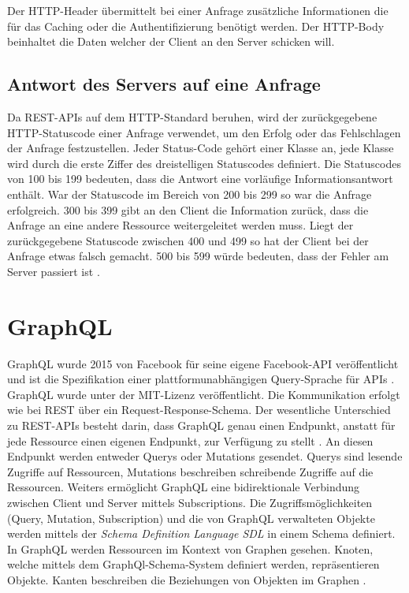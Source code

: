 Der HTTP-Header übermittelt bei einer Anfrage zusätzliche Informationen die für das Caching oder die Authentifizierung benötigt werden.
\newline
Der HTTP-Body beinhaltet die Daten welcher der Client an den Server schicken will.

\subsection{Antwort des Servers auf eine Anfrage}
Da REST-APIs auf dem HTTP-Standard beruhen, wird der zurückgegebene HTTP-Statuscode einer Anfrage verwendet, um den Erfolg oder das Fehlschlagen der Anfrage festzustellen.
Jeder Status-Code gehört einer Klasse an, jede Klasse wird durch die erste Ziffer des dreistelligen Statuscodes definiert.
Die Statuscodes von 100 bis 199 bedeuten, dass die Antwort eine vorläufige Informationsantwort enthält.
War der Statuscode im Bereich von 200 bis 299 so war die Anfrage erfolgreich.
300 bis 399 gibt an den Client die Information zurück, dass die Anfrage an eine andere Ressource weitergeleitet werden muss.
Liegt der zurückgegebene Statuscode zwischen 400 und 499 so hat der Client bei der Anfrage etwas falsch gemacht.
500 bis 599 würde bedeuten, dass der Fehler am Server passiert ist \cite[S. 120]{fielding2000architectural}.

\section{GraphQL}
GraphQL wurde 2015 von Facebook für seine eigene Facebook-API veröffentlicht und ist die Spezifikation einer plattformunabhängigen Query-Sprache für APIs \cite[S. 18]{kress2020graphql}.
GraphQL wurde unter der MIT-Lizenz veröffentlicht.
Die Kommunikation erfolgt wie bei REST über ein Request-Response-Schema.
Der wesentliche Unterschied zu REST-APIs besteht darin, dass GraphQL genau einen Endpunkt, anstatt für jede Ressource einen eigenen Endpunkt, zur Verfügung zu stellt \cite[S. 18]{kress2020graphql}.
An diesen Endpunkt werden entweder Querys oder Mutations gesendet.
Querys sind lesende Zugriffe auf Ressourcen, Mutations beschreiben schreibende Zugriffe auf die Ressourcen.
Weiters ermöglicht GraphQL eine bidirektionale Verbindung zwischen Client und Server mittels Subscriptions.
Die Zugriffsmöglichkeiten (Query, Mutation, Subscription) und die von GraphQL verwalteten Objekte werden mittels der \textit{Schema Definition Language SDL} in einem Schema definiert.
In GraphQL werden Ressourcen im Kontext von Graphen gesehen.
Knoten, welche mittels dem GraphQl-Schema-System definiert werden, repräsentieren Objekte.
Kanten beschreiben die Beziehungen von Objekten im Graphen \cite[Abs. Basics of a GraphQL API]{rakutenGraphQLVsRest}.
\newline

